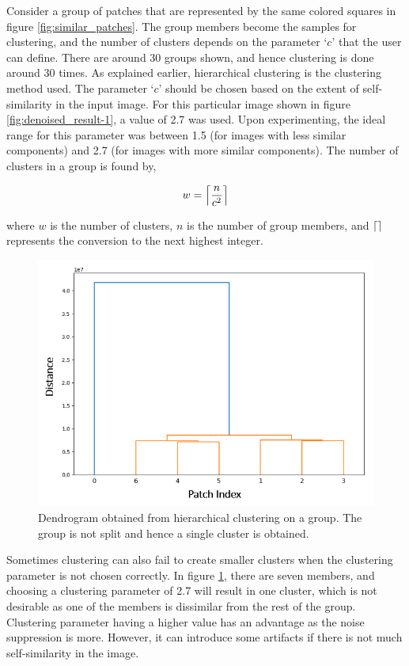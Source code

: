 \documentclass[fleqn,10pt]{wlscirep}
\DeclarePairedDelimiter\ceil{\lceil}{\rceil}
\begin{document}
Consider a group of patches that are represented by the same colored squares in figure \ref{fig:similar_patches}. The group members become the samples for clustering, and the number of clusters depends on the parameter `$c$’ that the user can define. There are around 30 groups shown, and hence clustering is done around 30 times. As explained earlier, hierarchical clustering is the clustering method used. The parameter `$c$’ should be chosen based on the extent of self-similarity in the input image. For this particular image shown in figure \ref{fig:denoised_result-1}, a value of 2.7 was used. Upon experimenting, the ideal range for this parameter was between 1.5 (for images with less similar components) and 2.7 (for images with more similar components). The number of clusters in a group is found by,

\begin{equation}
	w = \ceil*{\frac{n}{c^{2}}}
	\label{eq:clustering}
\end{equation}

where $w$ is the number of clusters, $n$ is the number of group members, and $\ceil{}$ represents the conversion to the next highest integer.

\begin{figure}
	\centering
	\includegraphics[scale=0.7]{./imgs/bad_clustering.png}
	\caption[Clustering - bad example]{Dendrogram obtained from hierarchical clustering on a group. The group is not split and hence a single cluster is obtained.}
	\label{fig:bad_clustering}
\end{figure}

Sometimes clustering can also fail to create smaller clusters when the clustering parameter is not chosen correctly. In figure \ref{fig:bad_clustering}, there are seven members, and choosing a clustering parameter of 2.7 will result in one cluster, which is not desirable as one of the members is dissimilar from the rest of the group. Clustering parameter having a higher value has an advantage as the noise suppression is more. However, it can introduce some artifacts if there is not much self-similarity in the image. 
\end{document}
